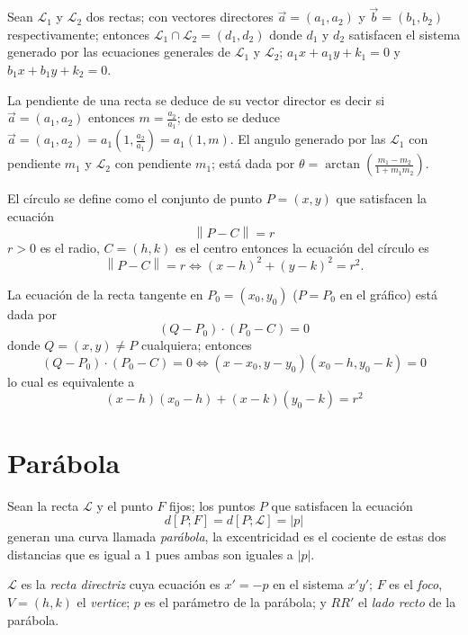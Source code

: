 \documentclass[12pt,]{report}
\theoremstyle{slplain}
\begin{document}
Sean \(\mathcal{L}_1\) y \(\mathcal{L}_2\) dos rectas; con vectores directores \(\vec{a}=(a_1,a_2)\) y \(\vec{b}=(b_1,b_2)\) respectivamente; entonces \(\mathcal{L}_1\cap\mathcal{L}_2=(d_1,d_2)\) donde \(d_1\) y \(d_2\) satisfacen el sistema generado por las ecuaciones generales de \(\mathcal{L}_1\) y \(\mathcal{L}_2\); \(a_1x+a_1y+k_1=0\) y \(b_1x+b_1y+k_2=0\).

La pendiente de una recta se deduce de su vector director es decir si \(\vec{a}=(a_1,a_2)\) entonces \(m=\frac{a_2}{a_1}\); de esto se deduce \(\vec{a}=(a_1,a_2)=a_1(1,\frac{a_2}{a_1})=a_1(1,m)\). El angulo generado por las \(\mathcal{L}_1\) con pendiente \(m_1\) y \(\mathcal{L}_2\) con pendiente \(m_1\); está dada por \(\theta=\arctan\left(\frac{m_1-m_2}{1+m_1m_2}\right)\).

El círculo se define como el conjunto de punto \(P=(x,y)\) que satisfacen la ecuación \[\left \|P-C\right\|=r\] \(r>0\) es el radio, \(C=(h,k)\) es el centro entonces la ecuación del círculo es \[\left \|P-C\right\|=r\iff (x-h)^2+(y-k)^2=r^2.\]

La ecuación de la recta tangente en \(P_0=(x_0,y_0)\) (\(P=P_0\) en el gráfico) está dada por \[(Q-P_0)\cdot(P_0-C)=0\] donde \(Q=(x,y)\neq P\) cualquiera; entonces \[(Q-P_0)\cdot(P_0-C)=0\iff  (x-x_0,y-y_0)(x_0-h,y_0-k)=0\] lo cual es equivalente a \[(x-h)(x_0-h)+(x-k)(y_0-k)=r^2\]

\hypertarget{paruxe1bola}{%
\chapter{Parábola}\label{paruxe1bola}}

Sean la recta \(\mathcal{L}\) y el punto \(F\) fijos; los puntos \(P\) que satisfacen la ecuación
\begin{equation} 
d\left[P;F\right]=d\left[P;\mathcal{L}\right]=\left|p\right|\label{eq:www}
\end{equation} generan una curva llamada \emph{parábola}, la excentricidad es el cociente de estas dos distancias que es igual a \(1\) pues ambas son iguales a \(\left|p\right|\).

\(\mathcal{L}\) es la \emph{recta directriz} cuya ecuación es \(x'=-p\) en el sistema \(x'y'\); \(F\) es el \emph{foco}, \(V=(h,k)\) el \emph{vertice}; \(p\) es el parámetro de la parábola; y \(RR'\) el \emph{lado recto} de la parábola.
\end{document}
